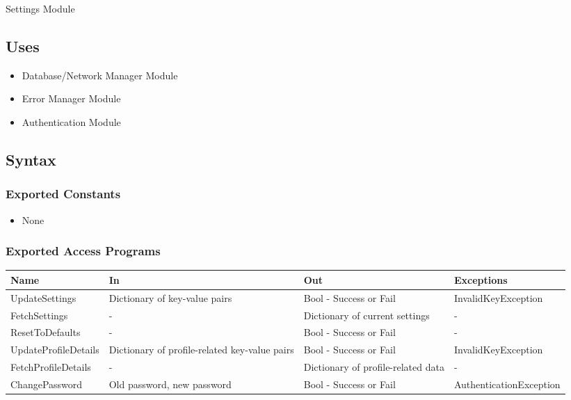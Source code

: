 \documentclass[12pt, titlepage]{article}
\begin{document}
Settings Module

\subsection{Uses}

\begin{itemize}
  \item Database/Network Manager Module
  \item Error Manager Module
  \item Authentication Module
\end{itemize}

\subsection{Syntax}

\subsubsection{Exported Constants}

\begin{itemize}
  \item None
\end{itemize}

\subsubsection{Exported Access Programs}

\begin{center}
  \begin{tabular}{p{4cm} p{4cm} p{4cm} p{4cm}}
    \hline
    \textbf{Name}        & \textbf{In}                                   & \textbf{Out}                       & \textbf{Exceptions}     \\
    \hline
    UpdateSettings       & Dictionary of key-value pairs                 & Bool - Success or Fail             & InvalidKeyException     \\
    \hline
    FetchSettings        & -                                             & Dictionary of current settings     & -                       \\
    \hline
    ResetToDefaults      & -                                             & Bool - Success or Fail             & -                       \\
    \hline
    UpdateProfileDetails & Dictionary of profile-related key-value pairs & Bool - Success or Fail             & InvalidKeyException     \\
    \hline
    FetchProfileDetails  & -                                             & Dictionary of profile-related data & -                       \\
    \hline
    ChangePassword       & Old password, new password                    & Bool - Success or Fail             & AuthenticationException \\
    \hline
  \end{tabular}
\end{center}
\end{document}

